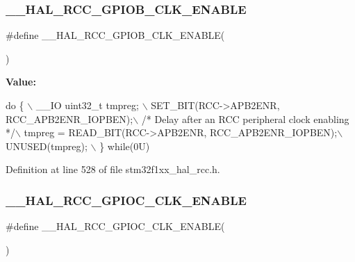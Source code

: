 \subsubsection{\texorpdfstring{\+\_\+\+\_\+\+H\+A\+L\+\_\+\+R\+C\+C\+\_\+\+G\+P\+I\+O\+B\+\_\+\+C\+L\+K\+\_\+\+E\+N\+A\+B\+LE}{\_\_HAL\_RCC\_GPIOB\_CLK\_ENABLE}}
{\footnotesize\ttfamily \#define \+\_\+\+\_\+\+H\+A\+L\+\_\+\+R\+C\+C\+\_\+\+G\+P\+I\+O\+B\+\_\+\+C\+L\+K\+\_\+\+E\+N\+A\+B\+LE(\begin{DoxyParamCaption}{ }\end{DoxyParamCaption})}

{\bfseries Value\+:}
\begin{DoxyCode}
\textcolor{keywordflow}{do} \{ \(\backslash\)
                                        \_\_IO uint32\_t tmpreg; \(\backslash\)
                                        SET\_BIT(RCC->APB2ENR, RCC\_APB2ENR\_IOPBEN);\(\backslash\)
                                        \textcolor{comment}{/* Delay after an RCC peripheral clock enabling */}\(\backslash\)
                                        tmpreg = READ\_BIT(RCC->APB2ENR, RCC\_APB2ENR\_IOPBEN);\(\backslash\)
                                        UNUSED(tmpreg); \(\backslash\)
                                      \} \textcolor{keywordflow}{while}(0U)
\end{DoxyCode}


Definition at line 528 of file stm32f1xx\+\_\+hal\+\_\+rcc.\+h.

\mbox{\label{group___r_c_c___a_p_b2___clock___enable___disable_ga5ebfeb136612f370950f52306d29b6fd}} 
\subsubsection{\texorpdfstring{\+\_\+\+\_\+\+H\+A\+L\+\_\+\+R\+C\+C\+\_\+\+G\+P\+I\+O\+C\+\_\+\+C\+L\+K\+\_\+\+E\+N\+A\+B\+LE}{\_\_HAL\_RCC\_GPIOC\_CLK\_ENABLE}}
{\footnotesize\ttfamily \#define \+\_\+\+\_\+\+H\+A\+L\+\_\+\+R\+C\+C\+\_\+\+G\+P\+I\+O\+C\+\_\+\+C\+L\+K\+\_\+\+E\+N\+A\+B\+LE(\begin{DoxyParamCaption}{ }\end{DoxyParamCaption})}

